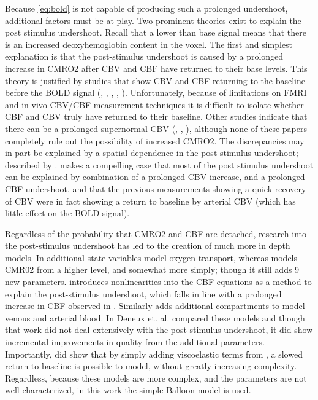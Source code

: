 Because \autoref{eq:bold} is not capable of producing such a prolonged undershoot,
additional factors must be at play. Two prominent theories exist to explain the post 
stimulus undershoot.  Recall
that a lower than base signal means that there is an increased deoxyhemoglobin
content in the voxel. The first and simplest explanation is that the post-stimulus
undershoot is caused by a prolonged increase in CMRO2 after CBV and CBF
have returned to their base levels. This theory is justified by 
studies that show CBV and CBF returning to the baseline before the BOLD signal
(\cite{Frahm2008}, \cite{Donahue2009}, \cite{Buxton2004}, \cite{Lu2004},
\cite{Shen2008}). Unfortunately, because of limitations on FMRI and in vivo
CBV/CBF measurement techniques it is difficult to isolate whether CBF and
CBV truly have returned to their baseline. Other studies indicate
that there can be a prolonged supernormal CBV (\cite{Mandeville1999a}, 
\cite{Behzadi2005}, \cite{Chen2009a}), although none of these papers completely
rule out the possibility of increased CMRO2. The discrepancies may in part
be explained by a spatial dependence in the post-stimulus undershoot; described
by \cite{Yacoub2006}. \cite{Chen2009}
makes a compelling case that most of the post stimulus undershoot can be 
explained by combination of a prolonged CBV increase, and a prolonged CBF 
undershoot, and that
the previous measurements showing a quick recovery of CBV 
were in fact showing a return to baseline by arterial CBV (which
has little effect on the BOLD signal).

Regardless of the probability that CMRO2 and CBF are detached,
research into the post-stimulus undershoot has led to the creation
of much more in depth models. In \cite{Zheng2002} additional state
variables model oxygen transport, whereas \cite{Buxton2004} models
CMR02 from a higher level, and somewhat more simply; though it 
still adds 9 new parameters. \cite{Behzadi2005}
introduces nonlinearities into the CBF equations as a method to
explain the post-stimulus undershoot, which falls in line with a 
prolonged increase in CBF observed in \cite{Chen2009}. Similarly
\cite{Zheng2005} adds additional compartments to model 
venous and arterial blood. 
In \cite{Deneux2006} Deneux et. al. compared these models and though 
that work did not deal extensively with the 
post-stimulus undershoot, it did show incremental improvements
in quality from the additional parameters. 
Importantly,\cite{Deneux2006} did show that by 
simply adding viscoelastic terms from \cite{Buxton2004}, a slowed return 
to baseline is possible to model, without greatly increasing
complexity. Regardless, because these models are more 
complex, and the parameters are not well characterized, in this work the simple
Balloon model is used. 

